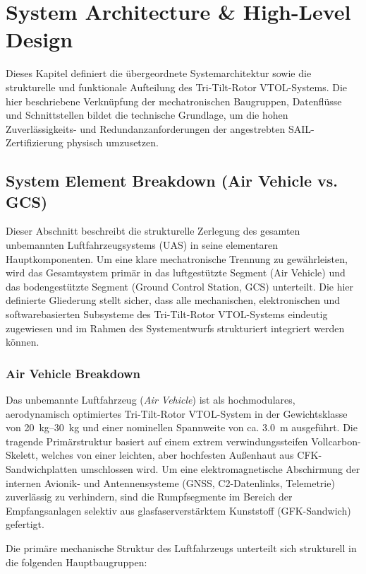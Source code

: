 ﻿\chapter{System Architecture \& High-Level Design}
\label{ch:architecture}

Dieses Kapitel definiert die übergeordnete Systemarchitektur sowie die strukturelle und funktionale Aufteilung des 
Tri-Tilt-Rotor VTOL-Systems. Die hier beschriebene Verknüpfung der mechatronischen Baugruppen, Datenflüsse und Schnittstellen 
bildet die technische Grundlage, 
um die hohen Zuverlässigkeits- und Redundanzanforderungen der angestrebten SAIL-Zertifizierung physisch umzusetzen.

\section{System Element Breakdown (Air Vehicle vs. GCS)}

Dieser Abschnitt beschreibt die strukturelle Zerlegung des gesamten unbemannten Luftfahrzeugsystems (UAS) in seine 
elementaren Hauptkomponenten. Um eine klare mechatronische Trennung zu gewährleisten, wird das Gesamtsystem primär in 
das luftgestützte Segment (Air Vehicle) und das bodengestützte Segment (Ground Control Station, GCS) unterteilt. Die 
hier definierte Gliederung stellt sicher, dass alle mechanischen, elektronischen und softwarebasierten Subsysteme des Tri-Tilt-Rotor 
VTOL-Systems eindeutig zugewiesen und im Rahmen des Systementwurfs strukturiert integriert werden können.

\subsection{Air Vehicle Breakdown}
Das unbemannte Luftfahrzeug (\textit{Air Vehicle}) ist als hochmodulares, aerodynamisch optimiertes Tri-Tilt-Rotor VTOL-System in der Gewichtsklasse von \SIrange{20}{30}{\kg} und einer nominellen Spannweite von ca. \SI{3.0}{\m} ausgeführt. Die tragende Primärstruktur basiert auf einem extrem verwindungssteifen Vollcarbon-Skelett, welches von einer leichten, aber hochfesten Außenhaut aus CFK-Sandwichplatten umschlossen wird. Um eine elektromagnetische Abschirmung der internen Avionik- und Antennensysteme (GNSS, C2-Datenlinks, Telemetrie) zuverlässig zu verhindern, sind die Rumpfsegmente im Bereich der Empfangsanlagen selektiv aus glasfaserverstärktem Kunststoff (GFK-Sandwich) gefertigt. 

\noindent Die primäre mechanische Struktur des Luftfahrzeugs unterteilt sich strukturell in die folgenden Hauptbaugruppen:

